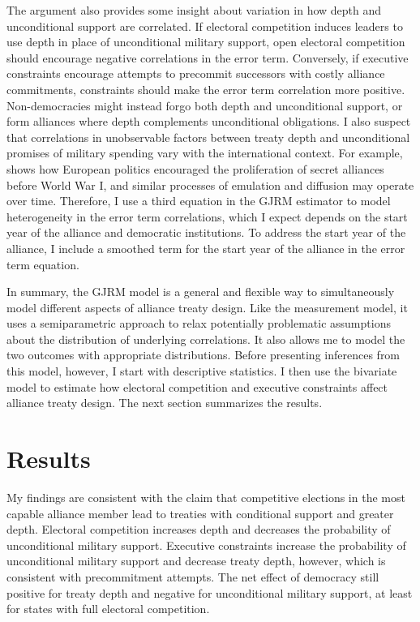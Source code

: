 \documentclass[12pt]{article}
\begin{document}
The argument also provides some insight about variation in how depth and unconditional support are correlated.  
If electoral competition induces leaders to use depth in place of unconditional military support, open electoral competition should encourage negative correlations in the error term. 
Conversely, if executive constraints encourage attempts to precommit successors with costly alliance commitments, constraints should make the error term correlation more positive.
Non-democracies might instead forgo both depth and unconditional support, or form alliances where depth complements unconditional obligations. 
I also suspect that correlations in unobservable factors between treaty depth and unconditional promises of military spending vary with the international context.
For example, \citet{Kuo2019} shows how European politics encouraged the proliferation of secret alliances before World War I, and similar processes of emulation and diffusion may operate over time.
Therefore, I use a third equation in the GJRM estimator to model heterogeneity in the error term correlations, which I expect depends on the start year of the alliance and democratic institutions.
To address the start year of the alliance, I include a smoothed term for the start year of the alliance in the error term equation.  


In summary, the GJRM model is a general and flexible way to simultaneously model different aspects of alliance treaty design.
Like the measurement model, it uses a semiparametric approach to relax potentially problematic assumptions about the distribution of underlying correlations. 
It also allows me to model the two outcomes with appropriate distributions. 
Before presenting inferences from this model, however, I start with descriptive statistics. 
I then use the bivariate model to estimate how electoral competition and executive constraints affect alliance treaty design. 
The next section summarizes the results. 


\section{Results}


My findings are consistent with the claim that competitive elections in the most capable alliance member lead to treaties with conditional support and greater depth. 
Electoral competition increases depth and decreases the probability of unconditional military support.
Executive constraints increase the probability of unconditional military support and decrease treaty depth, however, which is consistent with precommitment attempts.
The net effect of democracy still positive for treaty depth and negative for unconditional military support, at least for states with full electoral competition.   
\end{document}
